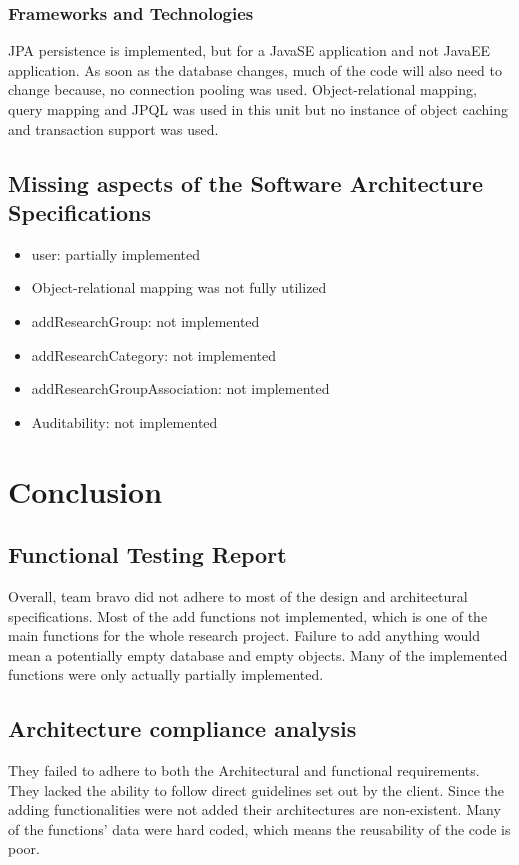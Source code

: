 \documentclass{article}
\begin{document}
\subsubsection{Frameworks and Technologies}
JPA persistence is implemented, but for a JavaSE application and not JavaEE application. As soon as the database changes, much of the code will also need to change because, no connection pooling was used. Object-relational mapping, query mapping and JPQL was used in this unit but no instance of object caching and transaction support was used.

\subsection{Missing aspects of the Software Architecture Specifications}
\begin{itemize}
	\item user: partially implemented
	\item Object-relational mapping was not fully utilized
	\item addResearchGroup: not implemented
	\item addResearchCategory: not implemented
	\item addResearchGroupAssociation: not implemented
	\item Auditability: not implemented
\end{itemize}

\section{Conclusion}
\subsection{Functional Testing Report}
Overall, team bravo did not adhere to most of the design and architectural specifications. Most of the add functions not implemented, which is one of the main functions for the whole research project. Failure to add anything would mean a potentially empty database and empty objects. Many of the implemented functions were only actually partially implemented.
\subsection{Architecture compliance analysis}
They failed to adhere to both the Architectural and functional requirements. They lacked the ability to follow direct guidelines set out by the client. Since the adding functionalities were not added their architectures are non-existent. Many of the functions' data were hard coded, which means the reusability of the code is poor. 
\end{document}
